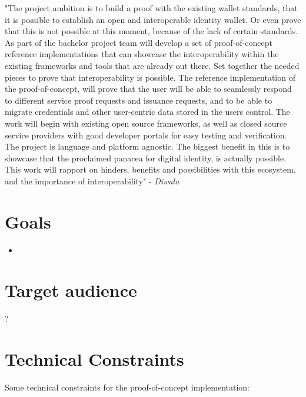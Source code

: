 "The project ambition is to build a proof with the existing wallet standards, that it is possible to establish an open and interoperable identity wallet. Or even prove that this is not possible at this moment, because of the lack of certain standards. As part of the bachelor project team will develop a set of proof-of-concept reference implementations that can showcase the interoperability within the existing frameworks and tools that are already out there. Set together the needed pieces to prove that interoperability is possible. The reference implementation of the proof-of-concept, will prove that the user will be able to seamlessly respond to different service proof requests and issuance requests, and to be able to migrate credentials and other user-centric data stored in the users control. The work will begin with existing open source frameworks, as well as closed source service providers with good developer portals for easy testing and verification. The project is language and platform agnostic. The biggest benefit in this is to showcase that the proclaimed panacea for digital identity, is actually possible. This work will rapport on hinders, benefits and possibilities with this ecosystem, and the importance of interoperability" \cite{ProjectDescription} - \textit{Diwala}






\section{Goals}

\begin{itemize}
    \item 
\end{itemize}


\section{Target audience}

?


\section{Technical Constraints}

Some technical constraints for the proof-of-concept implementation:

